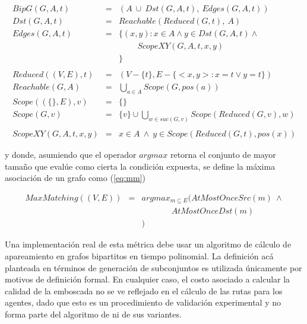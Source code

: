 \begin{small}
\begin{eqnarray}
BipG(G,A,t) & = & 
  (A\ \cup\ Dst(G,A,t),\ Edges(G,A,t)) \label{eq:bipgraph}\\
Dst(G,A,t) & = & Reachable(Reduced(G,t),\ A)\label{eq:bipgraphdst} \\
Edges(G,A,t) & = & \{ (x,y) : x \in A \wedge y \in Dst(G,A,t) \wedge\ \nonumber\\
& & \hspace{27pt} ScopeXY(G,A,t,x,y)\nonumber\\
& & \} \label{eq:bipgraphedges}\\
\nonumber\\
Reduced((V,E), t) & = & (V-\{t\}, E - \{<x,y>: x = t  \vee y = t\})\nonumber\\
Reachable(G,A) &=& \bigcup_{a \in A} Scope(G, pos(a))\nonumber\\
Scope((\{\},E), v) & = & \{\}\nonumber\\
Scope(G, v) & = & \{v\} \cup \bigcup_{w \in suc(G,v)}Scope(Reduced(G,v),w)\nonumber\\
\nonumber\\
ScopeXY(G,A,t,x,y) &=& x \in A \ \wedge\ y \in Scope(Reduced(G,t),pos(x))\nonumber
\end{eqnarray}
\end{small}

\noindent
y donde, asumiendo que el operador $argmax$ retorna el conjunto de mayor
tamaño que eval\'ue como cierta la condici\'on expuesta, se define
la m\'axima asociaci\'on de un grafo como (\ref{eq:mm})

\begin{small}
\begin{eqnarray}
MaxMatching((V,E)) & = & argmax_{m \subseteq E}( AtMostOnceSrc(m)\ \wedge\nonumber\\
				   &   & \hspace{43pt}AtMostOnceDst(m)\nonumber\\
				   &   & )
\label{eq:mm}
\end{eqnarray}
\end{small}

Una implementaci\'on real de esta m\'etrica debe usar un algoritmo de
c\'alculo de apareamiento en grafos bipartitos en tiempo polinomial\cite{Wes01}.
La definici\'on ac\'a planteada en t\'erminos de generaci\'on de subconjuntos
es utilizada \'unicamente por motivos de definici\'on formal. En cualquier caso,
el costo asociado a calcular la calidad de la emboscada no se ve reflejado en
el c\'alculo de las rutas para los agentes, dado que esto es un procedimiento
de validaci\'on experimental y no forma parte del algoritmo de \ambush ni de
sus va\-rian\-tes.